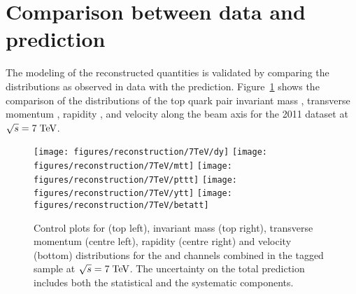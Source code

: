 \section{Comparison between data and prediction}
\label{sec:datamcreco}

The modeling of the reconstructed quantities is validated by comparing
the distributions as observed in data with the prediction. 
Figure~\ref{fig:datamcreco2011} 
shows the comparison of the distributions of
the top quark pair invariant mass \mtt{}, transverse momentum \pttt{},
rapidity \ytt{}, and velocity along the beam axis \betatt{} for the
2011 dataset at $\sqrt{s} = 7 \TeV{}$.
                                   
\begin{figure}[!htb]\centering
  \texttt{[image: figures/reconstruction/7TeV/dy]}
  \texttt{[image: figures/reconstruction/7TeV/mtt]}
  \texttt{[image: figures/reconstruction/7TeV/pttt]}
  \texttt{[image: figures/reconstruction/7TeV/ytt]}
  \texttt{[image: figures/reconstruction/7TeV/betatt]}
  \caption[Control plots for reconstructed quantities at $\sqrt{s} = 7
  \TeV{}$]{Control plots for \dy{} (top left), invariant mass \mtt{} 
    (top right), transverse momentum \pttt{} (centre left), rapidity
    \ytt{} (centre right) and velocity \betatt{} (bottom)
    distributions for the \ejets{} and \mujets{} channels combined in the
    tagged sample at $\sqrt{s} = 7 \TeV{}$. The uncertainty on the
    total prediction includes both the statistical and the systematic
    components.} 
  \label{fig:datamcreco2011}
\end{figure}


